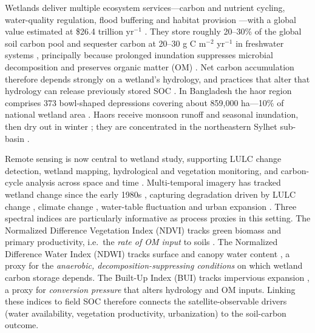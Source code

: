 \documentclass[preprint,authoryear,12pt]{elsarticle}
\begin{document}
Wetlands deliver multiple ecosystem services---carbon and nutrient cycling, water-quality
regulation, flood buffering and habitat provision \citep{Lamsal2017}---with a global value
estimated at \$26.4 trillion yr$^{-1}$ \citep{Costanza2014}. They store roughly 20--30\% of
the global soil carbon pool \citep{Nahlik2016} and sequester carbon at 20--30 g C m$^{-2}$
yr$^{-1}$ in freshwater systems \citep{Chmura2003}, principally because prolonged
inundation suppresses microbial decomposition and preserves organic matter (OM)
\citep{Xiaonan2008}. Net carbon accumulation therefore depends strongly on a wetland's
hydrology, and practices that alter that hydrology can release previously stored SOC
\citep{Limpert2020}. In Bangladesh the haor region comprises 373 bowl-shaped depressions
covering about 859{,}000 ha---10\% of national wetland area \citep{Davidson2014,HaorMasterPlan}.
Haors receive monsoon runoff and seasonal inundation, then dry out in winter
\citep{Nishat1993}; they are concentrated in the northeastern Sylhet sub-basin
\citep{Salauddin2010}.

Remote sensing is now central to wetland study, supporting LULC change detection, wetland
mapping, hydrological and vegetation monitoring, and carbon-cycle analysis across space and
time \citep{Schmidt2003,Erener2012}. Multi-temporal imagery has tracked wetland change since
the early 1980s \citep{Papastergiadou2007}, capturing degradation driven by LULC change
\citep{Guo2017}, climate change \citep{Donner2003}, water-table fluctuation \citep{Funk1994}
and urban expansion \citep{Gillies2003,Ramachandra2020}. Three spectral indices are
particularly informative as process proxies in this setting. The Normalized Difference
Vegetation Index (NDVI) tracks green biomass and primary productivity, i.e.\ the
\emph{rate of OM input} to soils \citep{Rouse1973}. The Normalized Difference Water Index
(NDWI) tracks surface and canopy water content \citep{McFeeters1996}, a proxy for the
\emph{anaerobic, decomposition-suppressing conditions} on which wetland carbon storage
depends. The Built-Up Index (BUI) tracks impervious expansion \citep{Zha2003}, a proxy for
\emph{conversion pressure} that alters hydrology and OM inputs. Linking these indices to
field SOC therefore connects the satellite-observable drivers (water availability,
vegetation productivity, urbanization) to the soil-carbon outcome.
\end{document}

